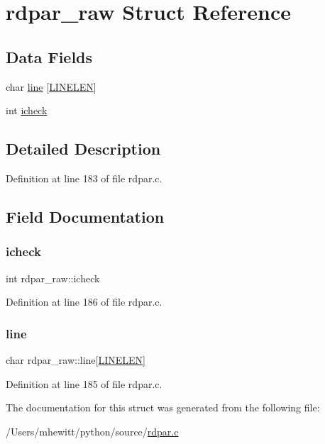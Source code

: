 \hypertarget{structrdpar__raw}{}\section{rdpar\+\_\+raw Struct Reference}
\label{structrdpar__raw}
\subsection*{Data Fields}
\begin{DoxyCompactItemize}
\item 
char \hyperlink{structrdpar__raw_a171237e0235e5b779e0866c42a220244}{line} \mbox{[}\hyperlink{wind__updates2d_8c_a764eaf37b6117ac7a17b1c049c1d2d16}{L\+I\+N\+E\+L\+EN}\mbox{]}
\item 
int \hyperlink{structrdpar__raw_af78ba9f399fc4748a5185a30162c5a22}{icheck}
\end{DoxyCompactItemize}


\subsection{Detailed Description}


Definition at line 183 of file rdpar.\+c.



\subsection{Field Documentation}
\mbox{\label{structrdpar__raw_af78ba9f399fc4748a5185a30162c5a22}} 
\subsubsection{\texorpdfstring{icheck}{icheck}}
{\footnotesize\ttfamily int rdpar\+\_\+raw\+::icheck}



Definition at line 186 of file rdpar.\+c.

\mbox{\label{structrdpar__raw_a171237e0235e5b779e0866c42a220244}} 
\subsubsection{\texorpdfstring{line}{line}}
{\footnotesize\ttfamily char rdpar\+\_\+raw\+::line\mbox{[}\hyperlink{wind__updates2d_8c_a764eaf37b6117ac7a17b1c049c1d2d16}{L\+I\+N\+E\+L\+EN}\mbox{]}}



Definition at line 185 of file rdpar.\+c.



The documentation for this struct was generated from the following file\+:\begin{DoxyCompactItemize}
\item 
/\+Users/mhewitt/python/source/\hyperlink{rdpar_8c}{rdpar.\+c}\end{DoxyCompactItemize}

